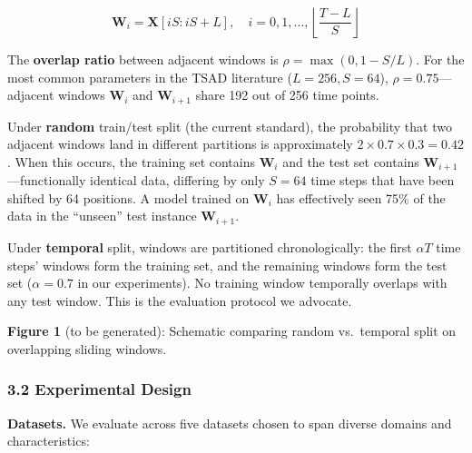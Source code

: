 \documentclass[
]{article}
\begin{document}
\[\mathbf{W}_i = \mathbf{X}[iS : iS + L], \quad i = 0, 1, \ldots, \left\lfloor\frac{T - L}{S}\right\rfloor\]

The \textbf{overlap ratio} between adjacent windows is
\(\rho = \max(0, 1 - S/L)\). For the most common parameters in the TSAD
literature (\(L = 256, S = 64\)), \(\rho = 0.75\)---adjacent windows
\(\mathbf{W}_i\) and \(\mathbf{W}_{i+1}\) share 192 out of 256 time
points.

Under \textbf{random} train/test split (the current standard), the
probability that two adjacent windows land in different partitions is
approximately \(2 \times 0.7 \times 0.3 = 0.42\). When this occurs, the
training set contains \(\mathbf{W}_i\) and the test set contains
\(\mathbf{W}_{i+1}\)---functionally identical data, differing by only
\(S = 64\) time steps that have been shifted by 64 positions. A model
trained on \(\mathbf{W}_i\) has effectively seen 75\% of the data in the
``unseen'' test instance \(\mathbf{W}_{i+1}\).

Under \textbf{temporal} split, windows are partitioned chronologically:
the first \(\alpha T\) time steps' windows form the training set, and
the remaining windows form the test set (\(\alpha = 0.7\) in our
experiments). No training window temporally overlaps with any test
window. This is the evaluation protocol we advocate.

\textbf{Figure 1} (to be generated): Schematic comparing random
vs.~temporal split on overlapping sliding windows.

\subsubsection{3.2 Experimental Design}\label{experimental-design}

\textbf{Datasets.} We evaluate across five datasets chosen to span
diverse domains and characteristics:
\end{document}
